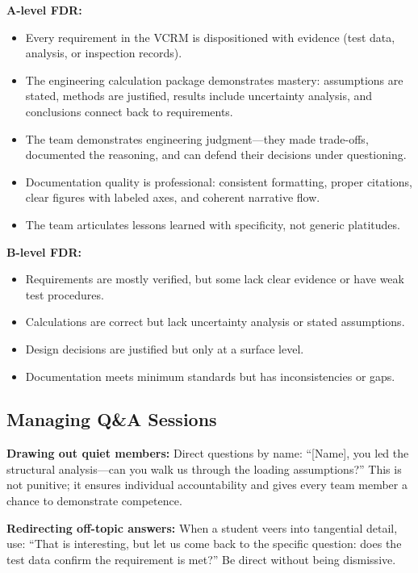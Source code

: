 \begin{faqbox}
\textbf{A-level FDR:}
\begin{itemize}[nosep,leftmargin=1.5em]
\item Every requirement in the VCRM is dispositioned with evidence (test data, analysis, or inspection records).
\item The engineering calculation package demonstrates mastery: assumptions are stated, methods are justified, results include uncertainty analysis, and conclusions connect back to requirements.
\item The team demonstrates engineering judgment---they made trade-offs, documented the reasoning, and can defend their decisions under questioning.
\item Documentation quality is professional: consistent formatting, proper citations, clear figures with labeled axes, and coherent narrative flow.
\item The team articulates lessons learned with specificity, not generic platitudes.
\end{itemize}

\textbf{B-level FDR:}
\begin{itemize}[nosep,leftmargin=1.5em]
\item Requirements are mostly verified, but some lack clear evidence or have weak test procedures.
\item Calculations are correct but lack uncertainty analysis or stated assumptions.
\item Design decisions are justified but only at a surface level.
\item Documentation meets minimum standards but has inconsistencies or gaps.
\end{itemize}
\end{faqbox}

\subsection{Managing Q\&A Sessions}

\begin{tipbox}
\textbf{Drawing out quiet members:} Direct questions by name: ``[Name], you led the structural analysis---can you walk us through the loading assumptions?'' This is not punitive; it ensures individual accountability and gives every team member a chance to demonstrate competence.
\end{tipbox}

\textbf{Redirecting off-topic answers:} When a student veers into tangential detail, use: ``That is interesting, but let us come back to the specific question: does the test data confirm the requirement is met?'' Be direct without being dismissive.

